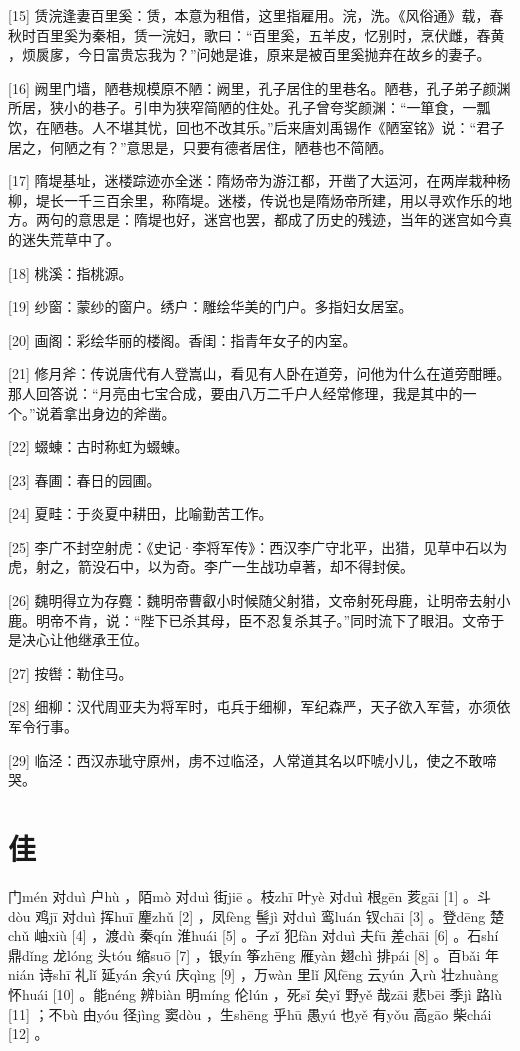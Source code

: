 \documentclass[12pt,UTF8]{ctexbook}
\begin{document}
[15] 赁浣逢妻百里奚：赁，本意为租借，这里指雇用。浣，洗。《风俗通》载，春秋时百里奚为秦相，赁一浣妇，歌曰：“百里奚，五羊皮，忆别时，烹伏雌，舂黄 ，烦扊扅，今日富贵忘我为？”问她是谁，原来是被百里奚抛弃在故乡的妻子。

[16] 阙里门墙，陋巷规模原不陋：阙里，孔子居住的里巷名。陋巷，孔子弟子颜渊所居，狭小的巷子。引申为狭窄简陋的住处。孔子曾夸奖颜渊：“一箪食，一瓢饮，在陋巷。人不堪其忧，回也不改其乐。”后来唐刘禹锡作《陋室铭》说：“君子居之，何陋之有？”意思是，只要有德者居住，陋巷也不简陋。

[17] 隋堤基址，迷楼踪迹亦全迷：隋炀帝为游江都，开凿了大运河，在两岸栽种杨柳，堤长一千三百余里，称隋堤。迷楼，传说也是隋炀帝所建，用以寻欢作乐的地方。两句的意思是：隋堤也好，迷宫也罢，都成了历史的残迹，当年的迷宫如今真的迷失荒草中了。

[18] 桃溪：指桃源。

[19] 纱窗：蒙纱的窗户。绣户：雕绘华美的门户。多指妇女居室。

[20] 画阁：彩绘华丽的楼阁。香闺：指青年女子的内室。

[21] 修月斧：传说唐代有人登嵩山，看见有人卧在道旁，问他为什么在道旁酣睡。那人回答说：“月亮由七宝合成，要由八万二千户人经常修理，我是其中的一个。”说着拿出身边的斧凿。

[22] 蝃蝀：古时称虹为蝃蝀。

[23] 春圃：春日的园圃。

[24] 夏畦：于炎夏中耕田，比喻勤苦工作。

[25] 李广不封空射虎：《史记·李将军传》：西汉李广守北平，出猎，见草中石以为虎，射之，箭没石中，以为奇。李广一生战功卓著，却不得封侯。

[26] 魏明得立为存麑：魏明帝曹叡小时候随父射猎，文帝射死母鹿，让明帝去射小鹿。明帝不肯，说：“陛下已杀其母，臣不忍复杀其子。”同时流下了眼泪。文帝于是决心让他继承王位。

[27] 按辔：勒住马。

[28] 细柳：汉代周亚夫为将军时，屯兵于细柳，军纪森严，天子欲入军营，亦须依军令行事。

[29] 临泾：西汉赤玼守原州，虏不过临泾，人常道其名以吓唬小儿，使之不敢啼哭。





\chapter{佳}


门mén 对duì 户hù ，陌mò 对duì 街jiē 。枝zhī 叶yè 对duì 根gēn 荄gāi [1] 。斗dòu 鸡jī 对duì 挥huī 麈zhǔ [2] ，凤fèng 髻jì 对duì 鸾luán 钗chāi [3] 。登dēng 楚chǔ 岫xiù [4] ，渡dù 秦qín 淮huái [5] 。子zǐ 犯fàn 对duì 夫fū 差chāi [6] 。石shí 鼎dǐng 龙lóng 头tóu 缩suō [7] ，银yín 筝zhēng 雁yàn 翅chì 排pái [8] 。百bǎi 年nián 诗shī 礼lǐ 延yán 余yú 庆qìng [9] ，万wàn 里lǐ 风fēng 云yún 入rù 壮zhuàng 怀huái [10] 。能néng 辨biàn 明míng 伦lún ，死sǐ 矣yǐ 野yě 哉zāi 悲bēi 季jì 路lù [11] ；不bù 由yóu 径jìng 窦dòu ，生shēng 乎hū 愚yú 也yě 有yǒu 高gāo 柴chái [12] 。
\end{document}

